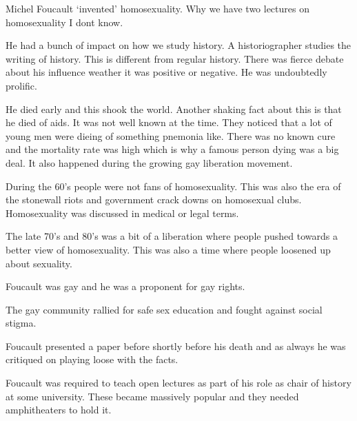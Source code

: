 \documentclass{article}
\begin{document}
Michel Foucault `invented' homosexuality. Why we have two lectures on homosexuality I dont know.

He had a bunch of impact on how we study history. A historiographer studies the writing of history. This is different from regular history. There was fierce debate about his influence weather it was positive or negative. He was undoubtedly prolific.

He died early and this shook the world. Another shaking fact about this is that he died of aids. It was not well known at the time. They noticed that a lot of young men were dieing of something pnemonia like. There was no known cure and the mortality rate was high which is why a famous person dying was a big deal. It also happened during the growing gay liberation movement.

During the 60's people were not fans of homosexuality. This was also the era of the stonewall riots and government crack downs on homosexual clubs. Homosexuality was discussed in medical or legal terms.

The late 70's and 80's was a bit of a liberation where people pushed towards a better view of homosexuality. This was also a time where people loosened up about sexuality.

Foucault was gay and he was a proponent for gay rights.

The gay community rallied for safe sex education and fought against social stigma.

Foucault presented a paper before shortly before his death and as always he was critiqued on playing loose with the facts.

Foucault was required to teach open lectures as part of his role as chair of history at some university. These became massively popular and they needed amphitheaters to hold it.
\end{document}
